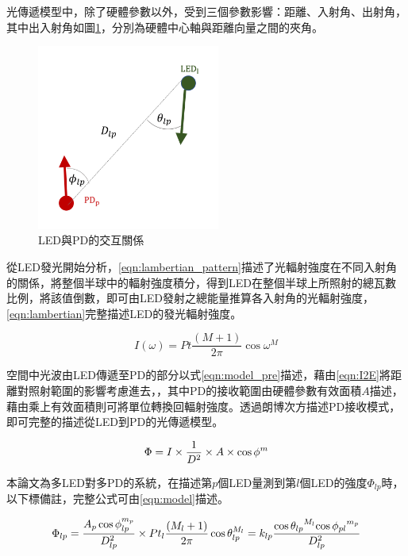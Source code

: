     光傳遞模型中，除了硬體參數以外，受到三個參數影響：距離、入射角、出射角，其中出入射角如圖\ref{pic:interactive}，分別為硬體中心軸與距離向量之間的夾角。

    \begin{figure}[ht]
        \centering
        \includegraphics[width=6cm]{00temppic/7.png}
        \caption{LED與PD的交互關係}
        \label{pic:interactive}
    \end{figure}

    從LED發光開始分析，\ref{eqn:lambertian_pattern}描述了光輻射強度在不同入射角的關係，將整個半球中的輻射強度積分，得到LED在整個半球上所照射的總瓦數比例，將該值倒數，即可由LED發射之總能量推算各入射角的光輻射強度，\ref{eqn:lambertian}完整描述LED的發光輻射強度。
    
    \begin{equation}
        \label{eqn:lambertian}
        I(\omega)=Pt\frac{(M+1)}{2 \pi} \cos \omega^{M}
    \end{equation}
    
    空間中光波由LED傳遞至PD的部分以式\ref{eqn:model_pre}描述，藉由\ref{eqn:I2E}將距離對照射範圍的影響考慮進去，，其中PD的接收範圍由硬體參數有效面積$A$描述，藉由乘上有效面積則可將單位轉換回輻射強度。透過朗博次方描述PD接收模式，即可完整的描述從LED到PD的光傳遞模型。
    
    \begin{equation}
        \label{eqn:model_pre}
        \Phi=I\times\frac{ 1 }{D^2}\times A\times\cos\phi^{m} \\
    \end{equation}
    


    本論文為多LED對多PD的系統，在描述第$p$個LED量測到第$l$個LED的強度$\Phi_{lp}$時，以下標備註，完整公式可由\ref{eqn:model}描述。
    
    \begin{equation}
        \label{eqn:model}
        \Phi_{lp}=\frac{ A_p\cos\phi_{lp}^{m_{p}} }{D^2_{lp}}\times Pt_l\frac{(M_{l}+1)}{2 \pi} \cos \theta_{lp}^{M_{l}}  \\
        =k_{lp}\frac{{\cos\theta_{lp}}^{M_{l}}{\cos\phi_{pl}}^{m_{p}}}{D_{lp}^2}\\
    \end{equation}

